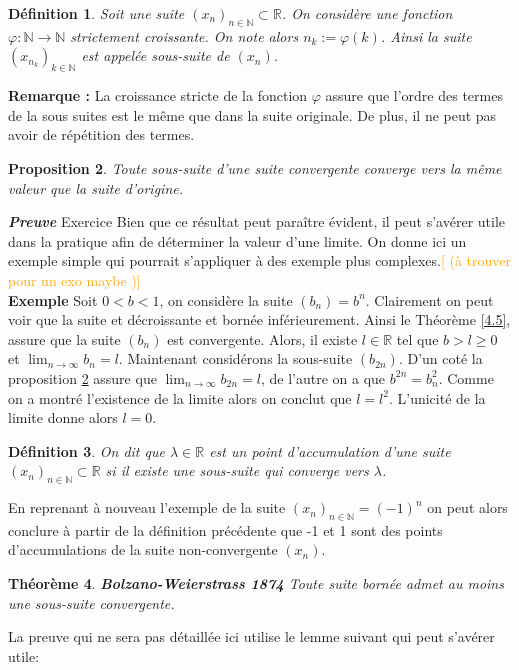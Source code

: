 \documentclass[a4paper, 12pt, french, twoside]{article}
\newtheorem{theorem}{Théorème}[section]
\newtheorem{proposition}[theorem]{Proposition}
\newtheorem{defi}[theorem]{Définition}
\newcommand{\Nn}{{\mathbb{N}}}
\newcommand{\Rr}{{\mathbb{R}}}
\newcommand{\later}[1]{\textcolor{orange}{[#1]}}
\begin{document}
\begin{defi}
 Soit une suite $(x_n)_{ n \in \Nn } \subset \Rr $. On considère une fonction $\varphi : \Nn \rightarrow \Nn $ strictement croissante. On note alors $n_k := \varphi(k)$. Ainsi la suite $(x_{n_k})_{k \in \Nn} $ est appelée \textit{sous-suite} de  $(x_n)$. 
 \end{defi}
 
\textbf{Remarque :} La croissance stricte de la fonction $\varphi$ assure que l'ordre des termes de la sous suites est le même que dans la suite originale. De plus, il ne peut pas avoir de répétition des termes. 


\begin{proposition}\label{2}
    Toute sous-suite d'une suite convergente converge vers la même valeur que la suite d'origine.  
\end{proposition}
\textit{\textbf{Preuve}} Exercice 
\newline 
Bien que ce résultat peut paraître évident, il peut s'avérer utile dans la pratique afin de déterminer la valeur d'une limite. On donne ici un exemple simple qui pourrait s'appliquer à des exemple plus complexes.\later{ (à trouver pour un exo maybe )}\newline \\
\textbf{Exemple} Soit $0<b<1$, on considère la suite $(b_n) = b^n$. Clairement on peut voir que la suite et décroissante et bornée inférieurement. Ainsi le Théorème \ref{4.5}, assure que la suite $(b_n)$ est convergente. Alors, il existe  $l \in \Rr$ tel que $b > l \ge 0$ et $\lim_{n \to \infty} b_n = l$. Maintenant considérons la sous-suite $(b_{2n})$. D'un coté la proposition \ref{2} assure que $\lim_{n \to \infty} b_{2n} = l$, de l'autre on a que $b^{2n} = b_n^2$. Comme on a montré l'existence de la limite alors on conclut que $l = l^2$. L'unicité de la limite donne alors $l=0$. \\


\begin{defi}\label{def422}
On dit que $\lambda \in \Rr $ est un point d'accumulation d'une suite $(x_n)_{n \in \Nn} \subset \Rr$ si il existe une sous-suite qui converge vers $\lambda$.
\end{defi}
En reprenant à nouveau l'exemple de la suite $(x_n)_{n \in \Nn} = (-1)^n$ on peut alors conclure à partir de la définition précédente que -1 et 1 sont des points d'accumulations de la suite non-convergente $(x_n)$.  
 
\begin{theorem}{\textbf{Bolzano-Weierstrass 1874}}
    Toute suite bornée admet au moins une sous-suite convergente. 
\end{theorem}
La preuve qui ne sera pas détaillée ici utilise le lemme suivant qui peut s'avérer utile:
\end{document}
